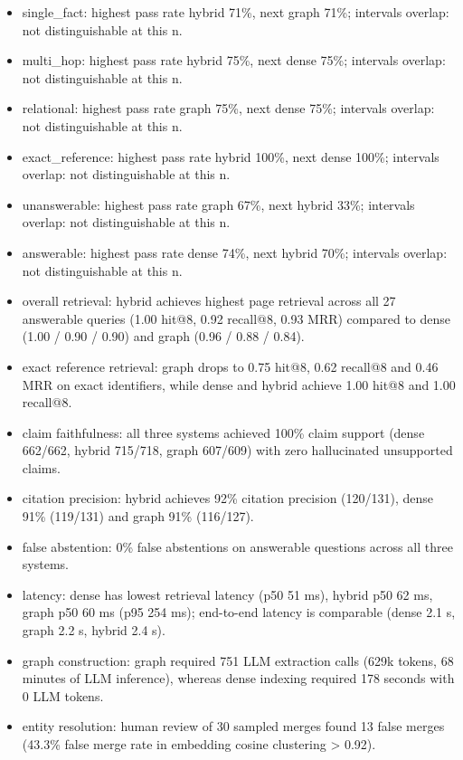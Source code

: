\begin{itemize}
\item single\_fact: highest pass rate hybrid 71\%, next graph 71\%; intervals overlap: not distinguishable at this n.
\item multi\_hop: highest pass rate hybrid 75\%, next dense 75\%; intervals overlap: not distinguishable at this n.
\item relational: highest pass rate graph 75\%, next dense 75\%; intervals overlap: not distinguishable at this n.
\item exact\_reference: highest pass rate hybrid 100\%, next dense 100\%; intervals overlap: not distinguishable at this n.
\item unanswerable: highest pass rate graph 67\%, next hybrid 33\%; intervals overlap: not distinguishable at this n.
\item answerable: highest pass rate dense 74\%, next hybrid 70\%; intervals overlap: not distinguishable at this n.
\item overall retrieval: hybrid achieves highest page retrieval across all 27 answerable queries (1.00 hit@8, 0.92 recall@8, 0.93 MRR) compared to dense (1.00 / 0.90 / 0.90) and graph (0.96 / 0.88 / 0.84).
\item exact reference retrieval: graph drops to 0.75 hit@8, 0.62 recall@8 and 0.46 MRR on exact identifiers, while dense and hybrid achieve 1.00 hit@8 and 1.00 recall@8.
\item claim faithfulness: all three systems achieved 100\% claim support (dense 662/662, hybrid 715/718, graph 607/609) with zero hallucinated unsupported claims.
\item citation precision: hybrid achieves 92\% citation precision (120/131), dense 91\% (119/131) and graph 91\% (116/127).
\item false abstention: 0\% false abstentions on answerable questions across all three systems.
\item latency: dense has lowest retrieval latency (p50 51 ms), hybrid p50 62 ms, graph p50 60 ms (p95 254 ms); end-to-end latency is comparable (dense 2.1 s, graph 2.2 s, hybrid 2.4 s).
\item graph construction: graph required 751 LLM extraction calls (629k tokens, 68 minutes of LLM inference), whereas dense indexing required 178 seconds with 0 LLM tokens.
\item entity resolution: human review of 30 sampled merges found 13 false merges (43.3\% false merge rate in embedding cosine clustering > 0.92).
\end{itemize}
